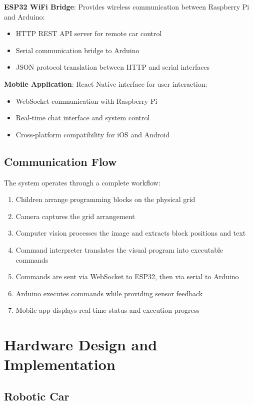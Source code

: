 \textbf{ESP32 WiFi Bridge}: Provides wireless communication between Raspberry Pi and Arduino:
\begin{itemize}
    \item HTTP REST API server for remote car control
    \item Serial communication bridge to Arduino
    \item JSON protocol translation between HTTP and serial interfaces
\end{itemize}

\textbf{Mobile Application}: React Native interface for user interaction:
\begin{itemize}
    \item WebSocket communication with Raspberry Pi
    \item Real-time chat interface and system control
    \item Cross-platform compatibility for iOS and Android
\end{itemize}

\subsection{Communication Flow}

The system operates through a complete workflow:
\begin{enumerate}
    \item Children arrange programming blocks on the physical grid
    \item Camera captures the grid arrangement
    \item Computer vision processes the image and extracts block positions and text
    \item Command interpreter translates the visual program into executable commands
    \item Commands are sent via WebSocket to ESP32, then via serial to Arduino
    \item Arduino executes commands while providing sensor feedback
    \item Mobile app displays real-time status and execution progress
\end{enumerate}

\section{Hardware Design and Implementation}

\subsection{Robotic Car}

